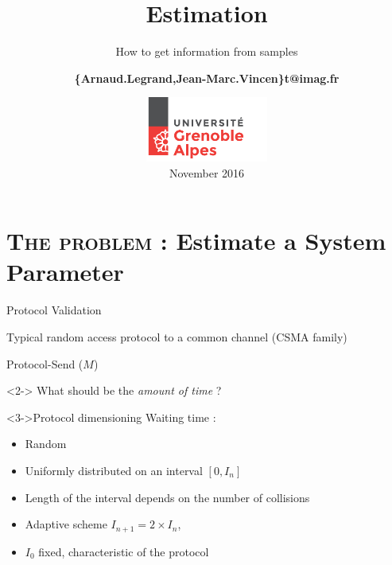 \documentclass[xcolor=x11names,compress,8pt,handout]{beamer}
\title[Estimation] %
{Estimation}
\subtitle{How to get information from samples}
\author%
{		
\textbf{\{Arnaud.Legrand,Jean-Marc.Vincen\}t@imag.fr}
}
\institute[Université de Grenoble-Alpes] %
{%
{\large Université  de Grenoble-Alpes, UFR IM$^\text{2}$AG\\
M2R-MOSIG Scientific Methodology}
}
\date[Grenoble 2016] %
{\includegraphics[width=4cm]{logos/logoUGA.jpg}\\November 2016
}
\renewcommand{\(}{\begin{columns}}
\renewcommand{\)}{\end{columns}}
\newcommand{\<}[1]{\begin{column}{#1}}
\renewcommand{\>}{\end{column}}
\begin{document}
\begin{frame}
\titlepage
\end{frame}

\section[{\scshape The problem}]{{\scshape The problem} : Estimate a System Parameter }

\begin{frame}{Protocol Validation}
\begin{block}{Typical random access protocol to a common channel (CSMA family)}

\colorbox{gris05}{
\hspace{0.05\textwidth}\begin{minipage}[t]{0.925\textwidth}
{}

\DontPrintSemicolon
\BlankLine
\hspace{-2.5ex}Protocol-Send ($M$)\;


\end{minipage}
}
\end{block}
\begin{alertblock}<2->{}
What should be the \textit{amount of time} ?
\end{alertblock}
\begin{block}<3->{Protocol dimensioning}
Waiting time :
\begin{itemize}
\item Random
\item Uniformly distributed on an interval $[0,I_n]$
\item Length of the interval depends on the number of collisions
\item Adaptive scheme $I_{n+1}= 2\times I_n$, 
\item $I_0$ fixed, characteristic of the protocol
\end{itemize}

\end{block}
\end{frame}
\end{document}
